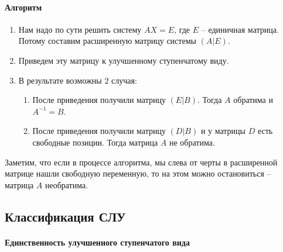 \paragraph{Алгоритм} 
\begin{enumerate}
\item Нам надо по сути решить систему $AX = E$, где $E$ -- единичная матрица.
Потому составим расширенную матрицу системы $(A|E)$.

\item Приведем эту матрицу к улучшенному ступенчатому виду.

\item В результате возможны $2$ случая:
\begin{enumerate}
\item После приведения получили матрицу $(E|B)$. Тогда $A$ обратима и $A^{-1} = B$. 
\item После приведения получили матрицу $(D|B)$ и у матрицы $D$ есть свободные позиции.
Тогда матрица $A$ не обратима.
\end{enumerate}
\end{enumerate}
Заметим, что если в процессе алгоритма, мы слева от черты в расширенной матрице нашли свободную переменную, то на этом можно остановиться -- матрица $A$ необратима.



\subsection{Классификация СЛУ}

\paragraph{Единственность улучшенного ступенчатого вида}

